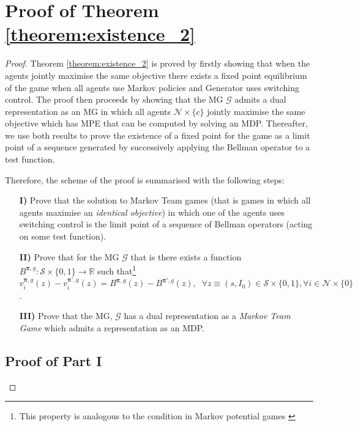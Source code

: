 \documentclass{article}
\begin{document}
\section*{Proof of Theorem \ref{theorem:existence_2}}
\begin{proof}
Theorem \ref{theorem:existence_2} is proved by firstly showing that when the agents jointly maximise the same objective there exists a fixed point equilibrium of the game when all agents use Markov policies and {\selectfont Generator} uses switching control. The proof then proceeds by showing that the MG $\mathcal{G}$ admits a dual representation as an MG in which all agents $\mathcal{N}\times\{c\}$ jointly maximise the same objective which has MPE that can be computed by solving an MDP. Thereafter, we use both results to prove the existence of a fixed point for the game as a limit point of a sequence generated by successively applying the Bellman operator to a test function.  

Therefore, the scheme of the proof is summarised with the following steps:
\begin{itemize}
    \item[\textbf{I)}] Prove that the solution to Markov Team games (that is games in which all agents maximise an \textit{identical objective}) in which one of the agents uses switching control is the limit point of a sequence of Bellman operators (acting on some test function).
    \item[\textbf{II)}] Prove that for the MG $\mathcal{G}$ that is there exists a function $B^{\boldsymbol{\pi},g}:\mathcal{S}\times \{0,1\}\to \mathbb{R}$ such that\footnote{This property is analogous to  the condition in Markov potential games \cite{macua2018learning,mguni2021learning}} $
 v^{\boldsymbol{\pi},g}_i(z)-v^{\boldsymbol{\pi'},g}_i(z)
=B^{\boldsymbol{\pi},g}(z)-B^{\boldsymbol{\pi'},g}(z),\;\;\forall z\equiv (s,I_0)\in\mathcal{S}\times \{0,1\}, \forall i\in\mathcal{N}\times\{0\}$.
    \item[\textbf{III)}] Prove that the MG, $\mathcal{G}$ has a dual representation as a \textit{Markov Team Game} which admits a representation as an MDP.
\end{itemize}





\subsection*{Proof of Part \textbf{I}}



\end{proof}
\end{document}
